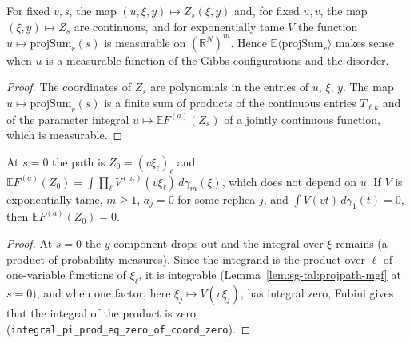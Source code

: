 \begin{lemma}
\label{lem:sg-tal:projpath-meas}
  \leanok
{}
For fixed $v,s$, the map $(u,\xi,y)\mapsto Z_s(\xi,y)$ and, for fixed $u,v$, the map $(\xi,y)\mapsto Z_s$ are continuous, and for exponentially tame $V$ the
function $u\mapsto\mathrm{projSum}_r(s)$ is measurable on $(\mathbb R^N)^m$.  Hence $\mathbb E\langle\mathrm{projSum}_r\rangle$ makes sense when $u$ is a measurable function of the Gibbs configurations and the disorder.
\end{lemma}
\begin{proof}
  \leanok
The coordinates of $Z_s$ are polynomials in the entries of $u$, $\xi$, $y$.  The map $u\mapsto\mathrm{projSum}_r(s)$ is a finite sum of products of the continuous entries $T_{\ell k}$ and of
the parameter integral $u\mapsto\mathbb E F^{(a)}(Z_s)$ of a jointly continuous function, which is measurable.
\end{proof}

\begin{lemma}
\label{lem:sg-tal:projpath-zero}
  \leanok
{}
At $s=0$ the path is $Z_0=(v\xi_\ell)_\ell$ and $\mathbb E F^{(a)}(Z_0)=\int\prod_\ell V^{(a_\ell)}(v\xi_\ell)\,d\gamma_m(\xi)$, which does not depend on $u$.
If $V$ is exponentially tame, $m\ge1$, $a_j=0$ for some replica $j$, and $\int V(vt)\,d\gamma_1(t)=0$, then $\mathbb E F^{(a)}(Z_0)=0$.
\end{lemma}
\begin{proof}
  \leanok
At $s=0$ the $y$-component drops out and the integral over $\xi$ remains (a product of probability measures).  Since the integrand is the product over $\ell$ of one-variable functions of
$\xi_\ell$, it is integrable (Lemma~\ref{lem:sg-tal:projpath-mgf} at $s=0$), and when one factor, here $\xi_j\mapsto V(v\xi_j)$, has integral zero, Fubini gives that the integral of the
product is zero (\texttt{integral\_pi\_prod\_eq\_zero\_of\_coord\_zero}).
\end{proof}

